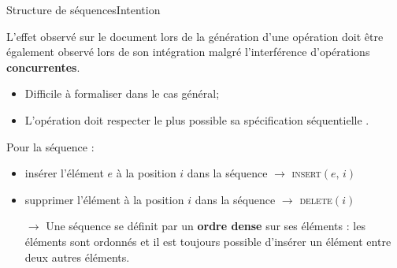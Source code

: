 \begin{frame}{Structure de séquences}{Intention}
  
  L'effet observé sur le document lors de la génération d'une opération doit
  être également observé lors de son intégration malgré l'interférence
  d'opérations \textbf{concurrentes}.

  \vspace{0.5cm}

  \begin{itemize}
  \item Difficile à formaliser dans le cas général;
  \item L'opération doit respecter le plus possible sa spécification
    séquentielle .
  \end{itemize}

  \vspace{0.5cm}
  
  Pour la séquence :
  \begin{itemize}
  \item \og insérer l'élément $e$ à la position $i$ dans la séquence \fg
    $\rightarrow$ \textsc{insert}$(e,\,i)$
  \item \small \og supprimer l'élément à la position $i$ dans la séquence \fg
    $\rightarrow$ \textsc{delete}$(i)$
  \end{itemize}


  \vspace{0.5cm}

  \begin{itemize}
  \item [$\rightarrow$] Une séquence se définit par un \textbf{ordre dense} sur
    ses éléments : les éléments sont ordonnés et il est toujours possible
    d'insérer un élément entre deux autres éléments.
  \end{itemize}

  \vspace{0.2cm}
  
\end{frame}



